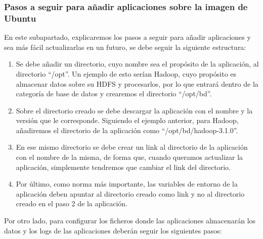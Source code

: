 \subsubsection{Pasos a seguir para añadir aplicaciones sobre la imagen de Ubuntu\label{pasosUbuntu}}

En este subapartado, explicaremos los pasos a seguir para añadir aplicaciones y sea más fácil actualizarlas en un futuro, se debe seguir la siguiente estructura:

\begin{enumerate}

\item Se debe añadir un directorio, cuyo nombre sea el propósito de la aplicación, al directorio “/opt”. Un ejemplo de esto serían Hadoop, cuyo propósito es almacenar datos sobre su HDFS y procesarlos, por lo que entrará dentro de la categoría de base de datos y crearemos el directorio “/opt/bd”.

\item Sobre el directorio creado se debe descargar la aplicación con el nombre y la versión que le corresponde. Siguiendo el ejemplo anterior, para Hadoop, añadiremos el directorio de la aplicación como “/opt/bd/hadoop-3.1.0”.

\item En ese mismo directorio se debe crear un link al directorio de la aplicación con el nombre de la misma, de forma que, cuando queramos actualizar la aplicación, simplemente tendremos que cambiar el link del directorio.

\item Por último, como norma más importante, las variables de entorno de la aplicación deben apuntar al directorio creado como link y no al directorio creado en el paso 2 de la aplicación.

\end{enumerate}


Por otro lado, para configurar los ficheros donde las aplicaciones almacenarán los datos y los logs de las aplicaciones deberán seguir los siguientes pasos:

